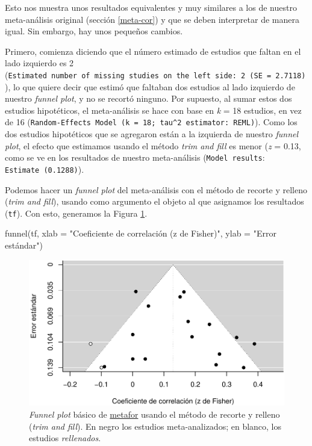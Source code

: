 \documentclass[
  bookmarksnumbered]{article}
\newenvironment{Shaded}{\begin{snugshade}}{\end{snugshade}}
\newcommand{\AttributeTok}[1]{\textcolor[rgb]{0.00,0.34,0.68}{#1}}
\newcommand{\FunctionTok}[1]{\textcolor[rgb]{0.39,0.29,0.61}{#1}}
\newcommand{\NormalTok}[1]{\textcolor[rgb]{0.12,0.11,0.11}{#1}}
\newcommand{\StringTok}[1]{\textcolor[rgb]{0.75,0.01,0.01}{#1}}
\begin{document}
Esto nos muestra unos resultados equivalentes y muy similares a los de nuestro meta-análisis original (sección \ref{meta-cor}) y que se deben interpretar de manera igual. Sin embargo, hay unos pequeños cambios.

Primero, comienza diciendo que el número estimado de estudios que faltan en el lado izquierdo es 2 (\texttt{Estimated\ number\ of\ missing\ studies\ on\ the\ left\ side:\ 2\ (SE\ =\ 2.7118)}), lo que quiere decir que estimó que faltaban dos estudios al lado izquierdo de nuestro \emph{funnel plot}, y no se recortó ninguno. Por supuesto, al sumar estos dos estudios hipotéticos, el meta-análisis se hace con base en \emph{k} = 18 estudios, en vez de 16 (\texttt{Random-Effects\ Model\ (k\ =\ 18;\ tau\^{}2\ estimator:\ REML)}). Como los dos estudios hipotéticos que se agregaron están a la izquierda de nuestro \emph{funnel plot}, el efecto que estimamos usando el método \emph{trim and fill} es menor (\emph{z} = 0.13, como se ve en los resultados de nuestro meta-análisis (\texttt{Model\ results}: \texttt{Estimate\ (0.1288)}).

Podemos hacer un \emph{funnel plot} del meta-análisis con el método de recorte y relleno (\emph{trim and fill}), usando como argumento el objeto al que asignamos los resultados (\texttt{tf}). Con esto, generamos la Figura \ref{fig:tf-plot1}.

\begin{Shaded}
\begin{Highlighting}[]
\FunctionTok{funnel}\NormalTok{(tf, }
       \AttributeTok{xlab =} \StringTok{"Coeficiente de correlación (z de Fisher)"}\NormalTok{,}
       \AttributeTok{ylab =} \StringTok{"Error estándar"}\NormalTok{)}
\end{Highlighting}
\end{Shaded}

\begin{figure}
\centering
\includegraphics{Meta-analysis_files/figure-latex/tf-plot1-1.pdf}
\caption{\label{fig:tf-plot1}\emph{Funnel plot} básico de \href{https://www.metafor-project.org/doku.php}{metafor} usando el método de recorte y relleno (\emph{trim and fill}). En negro los estudios meta-analizados; en blanco, los estudios \emph{rellenados}.}
\end{figure}
\end{document}
